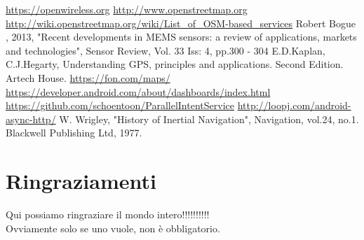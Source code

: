 \documentclass[12pt,a4paper,openright,twoside]{report}
\begin{document}
\begin{thebibliography}{90}
 \url{https://openwireless.org}
 \url{http://www.openstreetmap.org}
 \url{http://wiki.openstreetmap.org/wiki/List_of_OSM-based_services}
 Robert Bogue , 2013, "Recent developments in MEMS sensors: a review of applications, markets and technologies", Sensor Review, Vol. 33 Iss: 4, pp.300 - 304
 E.D.Kaplan, C.J.Hegarty, Understanding GPS, principles and applications. Second Edition. Artech House.
 \url{https://fon.com/maps/}
 \url{https://developer.android.com/about/dashboards/index.html}
 \url{https://github.com/schoentoon/ParallelIntentService}
 \url{http://loopj.com/android-async-http/}
 W. Wrigley, "History of Inertial Navigation", Navigation, vol.24, no.1. Blackwell Publishing Ltd, 1977.

\end{thebibliography}
\clearpage{\pagestyle{empty}\cleardoublepage}
\chapter*{Ringraziamenti}
\thispagestyle{empty}
Qui possiamo ringraziare il mondo intero!!!!!!!!!!\\
Ovviamente solo se uno vuole, non \`e obbligatorio.
\end{document}
